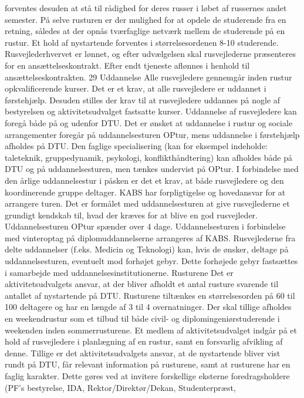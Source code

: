 forventes desuden at stå til rådighed for deres russer i løbet af russernes andet semester.
På selve rusturen er der mulighed for at opdele de studerende fra en retning, således at der opnås tværfaglige netværk
mellem de studerende på en rustur. Et hold af nystartende forventes i
størrelsesordenen 8-10 studerende. Rusvejlederhvervet er lønnet, og efter udvælgelsen skal rusvejlederne præsenteres
for en ansættelseskontrakt. Efter endt tjeneste aflønnes i henhold til ansættelseskontrakten.
29
Uddannelse
Alle rusvejledere gennemgår inden rustur opkvalificerende kurser. Det er et krav, at alle rusvejledere er uddannet i
førstehjælp. Desuden stilles der krav til at rusvejledere uddannes på nogle af bestyrelsen og aktivitetsudvalget fastsatte
kurser. Uddannelse af rusvejledere kan foregå både på og udenfor DTU. Det er ønsket at uddannelse i rustur og sociale
arrangementer foregår på uddannelsesturen OPtur, mens uddannelse i førstehjælp afholdes på DTU. Den faglige
specialisering (kan for eksempel indeholde: taleteknik, gruppedynamik, psykologi, konflikthåndtering) kan afholdes
både på DTU og på uddannelsesturen, men tænkes undervist på OPtur. I forbindelse med den årlige uddannelsestur i
påsken er det et krav, at både rusvejledere og den koordinerende gruppe deltager. KABS har forpligtigelse og
hovedansvar for at arrangere turen.
Det er formålet med uddannelsesturen at give rusvejlederne et grundigt kendskab til, hvad der kræves for at blive en
god rusvejleder. Uddannelsesturen OPtur spænder over 4 dage.
Uddannelsesturen i forbindelse med vinteroptag på diplomuddannelserne arrangeres af KABS.
Rusvejlederne fra delte uddannelser (f.eks. Medicin og Teknologi) kan, hvis de ønsker, deltage på
uddannelsesturen, eventuelt mod forhøjet gebyr. Dette forhøjede gebyr fastsættes i samarbejde med
uddannelsesinstitutionerne.
Rusturene
Det er aktivitetsudvalgets ansvar, at der bliver afholdt et antal rusture svarende til antallet af
nystartende på DTU. Rusturene tiltænkes en størrelsesorden på 60 til 100 deltagere og har en længde af 3 til 4
overnatninger. Der skal tillige afholdes en weekendrustur som et tilbud til både civil- og diplomingeniørstuderende i
weekenden inden sommerrusturene. Et medlem af aktivitetsudvalget indgår på et hold af rusvejledere i planlægning af
en rustur, samt en forsvarlig afvikling af denne. Tillige er det aktivitetsudvalgets ansvar, at de nystartende bliver vist
rundt på DTU, får relevant information på rusturene, samt at rusturene har en faglig karakter. Dette gøres ved at invitere
forskellige eksterne foredragsholdere (PF’s bestyrelse, IDA, Rektor/Direktør/Dekan, Studenterpræst,
